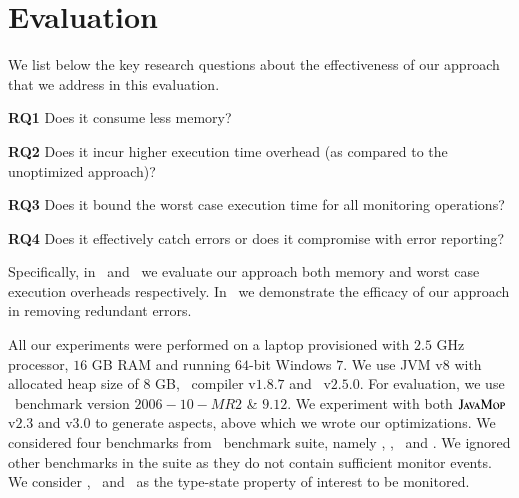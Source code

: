 \section{Evaluation}
\label{sec:evaluation}

We list below the key research questions about the effectiveness of our approach 
that we address in this evaluation.
\begin{mybullet}
\item[\textbf{RQ1}] Does it consume less memory?
\item[\textbf{RQ2}] Does it incur higher execution time overhead (as compared to 
the unoptimized approach)?
\item[\textbf{RQ3}] Does it bound the worst case execution time for all 
monitoring operations?
\item[\textbf{RQ4}] Does it effectively catch errors or does it compromise with 
error reporting?
\end{mybullet}

\noindent Specifically, in~ 
and~ we evaluate our approach both memory and worst 
case execution overheads respectively. In~ we 
demonstrate the efficacy of our approach in removing redundant errors.

 All our experiments were performed on a laptop 
provisioned with $2.5$ GHz processor, $16$ GB RAM and running $64$-bit Windows 
$7$. We use JVM v$8$ with allocated heap size of $8$ GB, \aspectj\ compiler 
v$1.8.7$ and \soot\ v$2.5.0$. For evaluation, we use \dacapo\ benchmark version 
$2006-10-MR2$ \& $9.12$. We experiment with both $\textsc{JavaMop}$ v$2.3$ and 
v$3.0$ to generate aspects, above which we wrote our optimizations. We 
considered four benchmarks from \dacapo\ benchmark suite, namely \bloat, \pmd, 
\chart\ and \avrora. We ignored other benchmarks in the suite as they do not 
contain sufficient monitor events. We consider \hasnext, \unsafeiter\ and 
\hashset\ as the type-state property of interest to be monitored.

